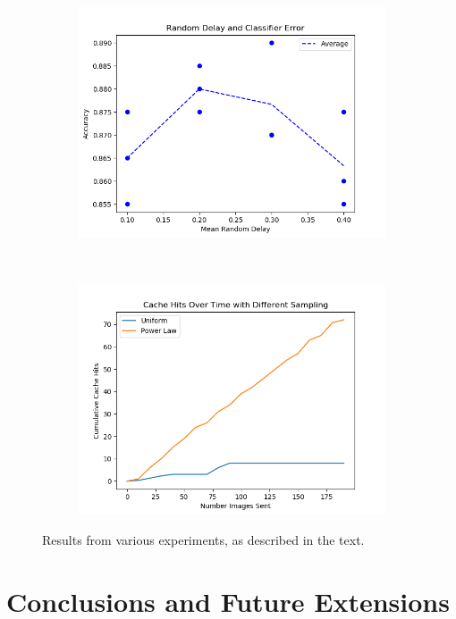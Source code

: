 \documentclass[11pt]{article}
\begin{document}
\begin{figure}[h]
\begin{subfigure}{0.35\textwidth}
        \includegraphics[width=\textwidth]{plot_2_final.png}
    \end{subfigure}
    ~
    \begin{subfigure}{0.35\textwidth}
        \includegraphics[width=\textwidth]{cache_over_time.png}
    \end{subfigure}
    \caption{Results from various experiments, as described in the text.}
    \label{fig:results}
\end{figure}


\section{Conclusions and Future Extensions}
\end{document}
